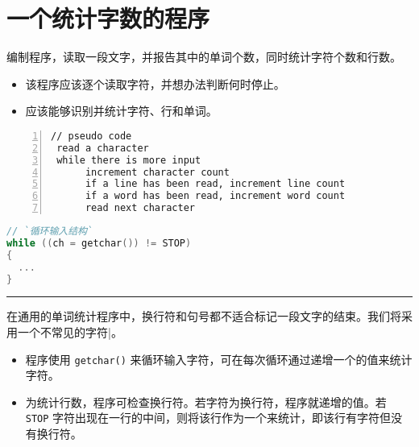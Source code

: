 \section{一个统计字数的程序}

\begin{frame}[fragile]\ft{\secname}
编制程序，读取一段文字，并报告其中的单词个数，同时统计字符个数和行数。
\end{frame}


\begin{frame}[fragile]\ft{\secname}
\begin{itemize}
\item 该程序应该逐个读取字符，并想办法判断何时停止。\\[0.2in]
\item 应该能够识别并统计字符、行和单词。
\end{itemize}
\end{frame}

\begin{frame}[fragile]\ft{\secname}
\begin{lstlisting}[frame=single,numbers=left]
// pseudo code
 read a character
 while there is more input
      increment character count
      if a line has been read, increment line count
      if a word has been read, increment word count
      read next character
\end{lstlisting}
\end{frame}

\begin{frame}[fragile]\ft{\secname}
\begin{lstlisting}[language=c]
// `循环输入结构`
while ((ch = getchar()) != STOP)
{
  ...
}
\end{lstlisting}
\rule{\textwidth}{1mm}\vspace{.5mm}\pause 

在通用的单词统计程序中，换行符和句号都不适合标记一段文字的结束。我们将采用一个不常见的字符{\tf |}。
\end{frame}

\begin{frame}[fragile]\ft{\secname}
\begin{itemize}
\item 程序使用 \lstinline|getchar()| 来循环输入字符，可在每次循环通过递增一个的值来统计字符。\\[0.15in]
\item 为统计行数，程序可检查换行符。若字符为换行符，程序就递增的值。若 \lstinline|STOP| 字符出现在一行的中间，则将该行作为一个来统计，即该行有字符但没有换行符。
\end{itemize}
\end{frame}

